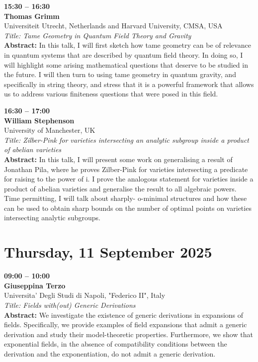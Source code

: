 \documentclass[10pt,a4paper]{article}
\begin{document}
\begin{tcolorbox}[talkbox]
\textbf{15:30 -- 16:30} \\
\textbf{Thomas Grimm} \\
Universiteit Utrecht, Netherlands and Harvard University, CMSA, USA \\
\textit{Title: Tame Geometry in Quantum Field Theory and Gravity} \\
\textbf{Abstract:} In this talk, I will first sketch how tame geometry can be of relevance in quantum systems that are described by quantum field theory. In doing so, I will highlight some arising mathematical questions that deserve to be studied in the future. I will then turn to using tame geometry in quantum gravity, and specifically in string theory, and stress that it is a powerful framework that allows us to address various finiteness questions that were posed in this field. 
\end{tcolorbox}
\begin{tcolorbox}[talkbox]
\textbf{16:30 -- 17:00} \\
\textbf{William Stephenson} \\
University of Manchester, UK \\
\textit{Title: Zilber-Pink for varieties intersecting an analytic subgroup inside a product of abelian varieties} \\
\textbf{Abstract:} In this talk, I will present some work on generalising a result of Jonathan Pila, where he proves Zilber-Pink for varieties intersecting a predicate for raising to the power of i. I prove the analogous statement for varieties inside a product of abelian varieties and generalise the result to all algebraic powers. Time permitting, I will talk about sharply- o-minimal structures and how these can be used to obtain sharp bounds on the number of optimal points on varieties intersecting analytic subgroups.
\end{tcolorbox}

\newpage

\section{Thursday, 11 September 2025}

\begin{tcolorbox}[talkbox]
\textbf{09:00 -- 10:00} \\
\textbf{Giuseppina Terzo} \\
Universita' Degli Studi di Napoli, "Federico II", Italy \\
\textit{Title: Fields with(out) Generic Derivations} \\
\textbf{Abstract:} We investigate the existence of generic derivations in expansions of fields. Specifically, we provide examples of field expansions that admit a generic derivation and study their model-theoretic properties. Furthermore, we show that exponential fields, in the absence of compatibility conditions between the derivation and the exponentiation, do not admit a generic derivation.
\end{tcolorbox}
\end{document}
